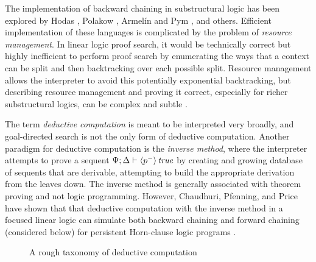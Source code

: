The implementation of backward chaining in substructural logic has
been explored by Hodas \cite{hodas94logic}, Polakow
\cite{polakow00linear,polakow01ordered}, Armel\'in and Pym
\cite{armelin01bunched}, and others. Efficient implementation of these
languages is complicated by the problem of {\it resource
  management}. In linear logic proof search, it would be technically
correct but highly inefficient to perform proof search by enumerating
the ways that a context can be split and then backtracking over each
possible split. Resource management allows the interpreter to avoid
this potentially exponential backtracking, but describing resource
management and proving it correct, especially for richer substructural
logics, can be complex and subtle \cite{cervesato00efficient}.

The term {\it deductive computation} is meant to be interpreted very
broadly, and goal-directed search is not the only form of deductive
computation. Another paradigm for deductive computation is the {\it
  inverse method}, where the interpreter attempts to prove a sequent
${\Psi};{\Delta} \vdash {{\langle {p^-} \rangle}\,{{\it true}}} \mathstrut$ by creating and growing
database of sequents that are derivable, attempting to build the
appropriate derivation from the leaves down. The inverse method is
generally associated with theorem proving and not logic
programming. However, Chaudhuri, Pfenning, and Price have shown that
that deductive computation with the inverse method in a focused linear
logic can simulate both backward chaining and forward chaining
(considered below) for persistent Horn-clause logic programs
\cite{chaudhuri10logical}. 

\begin{figure}
\caption{A rough taxonomy of deductive computation}
\label{fig:computation-taxonomy}
\end{figure}

